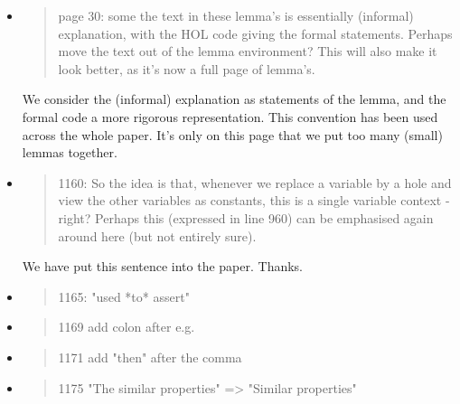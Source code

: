 \begin{itemize}

  \item \begin{quote}
page 30: some the text in these lemma's is essentially (informal) explanation, with the HOL code giving the formal statements. Perhaps move the text out of the lemma environment? This will also make it look better, as it's now a full page of lemma's. 
\end{quote}
  \Mark We consider the (informal) explanation as statements of the
  lemma, and the formal code a more rigorous representation. This
  convention has been used across the whole paper. It's only on this
  page that we put too many (small) lemmas together.


  \item \begin{quote}
1160: So the idea is that, whenever we replace a variable by a hole and view the other variables as constants, this is a single variable context - right? Perhaps this (expressed in line 960) can be emphasised again around here (but not entirely sure). 
\end{quote}
  \Mark We have put this sentence into the paper. Thanks.

  \item \begin{quote}
1165: "used *to* assert"
\end{quote}
  \Mark

  \item \begin{quote}
1169 add colon after e.g.
\end{quote}
  \Mark

  \item \begin{quote}
1171 add "then" after the comma 
\end{quote}
  \Mark

  \item \begin{quote}
1175 "The similar properties" => "Similar properties"
\end{quote}
  \Mark


\end{itemize}
